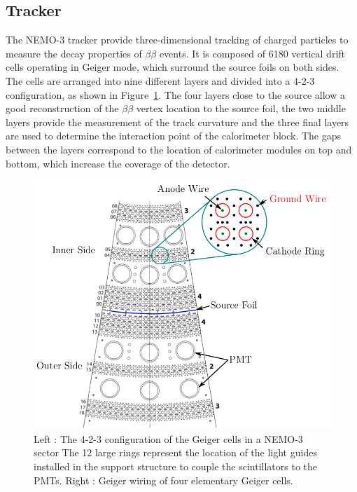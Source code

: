 \documentclass[main.tex]{subfiles}
\begin{document}
\FloatBarrier


\subsection{Tracker}


\NI The NEMO-3 tracker provide three-dimensional tracking of charged particles to measure the decay properties of $\beta\beta$ events. It is composed of 6180 vertical drift cells operating in Geiger mode, which surround the source foils on both sides. The cells are arranged into nine different layers and divided into a 4-2-3 configuration, as shown in Figure~\ref{TrackerNEMOView}. The four layers close to the source allow a good reconstruction of the $\beta\beta$ vertex location to the source foil, the two middle layers provide the measurement of the track curvature and the three final layers are used to determine the interaction point of the calorimeter block. The gaps between the layers correspond to the location of calorimeter modules on top and bottom, which increase the coverage of the detector.


\bigskip


\begin{figure}[h!]
\begin{center}
\includegraphics[scale=0.30]{pictures/Chap3/TrackerNEMOview.png}
\caption{Left : The 4-2-3 configuration of the Geiger cells in a NEMO-3 sector The 12 large rings represent the location of the light guides installed in the support structure to couple the scintillators to the PMTs. Right : Geiger
wiring of four elementary Geiger cells.}
\label{TrackerNEMOView}
\end{center}
\end{figure}
\end{document}
